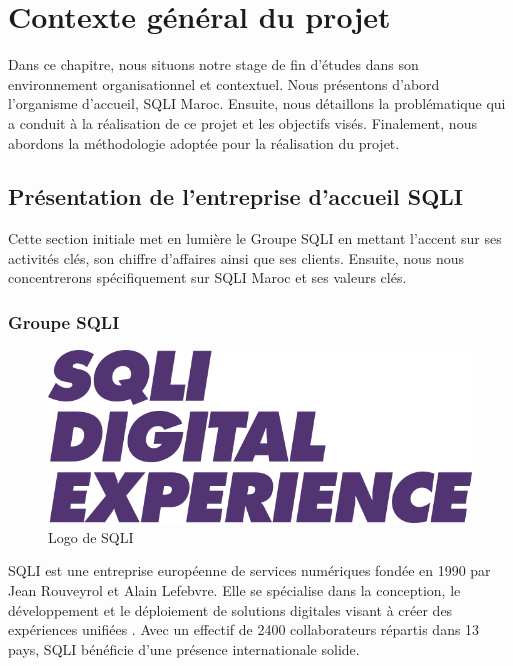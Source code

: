 \chapter{Contexte général du projet}
\label{chap:Contexte général du projet}



Dans ce chapitre, nous situons notre stage de fin d’études dans son environnement organisationnel et contextuel. Nous présentons d'abord l’organisme d’accueil, SQLI Maroc. Ensuite, nous détaillons la problématique qui a conduit à la réalisation de ce projet et les objectifs visés. Finalement, nous abordons la méthodologie adoptée pour la réalisation du projet.
\newpage


\section{Présentation de l’entreprise d’accueil SQLI}

Cette section initiale met en lumière le Groupe SQLI en mettant l’accent sur ses activités clés, son
chiffre d’affaires ainsi que ses clients. Ensuite, nous nous concentrerons spécifiquement sur SQLI Maroc et
ses valeurs clés.

\subsection{Groupe SQLI}

\begin{figure}[h]
    \centering
    \includegraphics[scale=0.7]{Logos/SQLI_LOGO.png} %
    \caption{Logo de SQLI \cite{SQLI}}
    \label{fig:LogoSQLI}
\end{figure}

SQLI est une entreprise européenne de services numériques fondée en 1990 par Jean Rouveyrol et Alain Lefebvre. Elle se spécialise dans la conception, le développement et le déploiement de solutions digitales
visant à créer des expériences unifiées \cite{SQLI}. Avec un effectif de 2400 collaborateurs répartis dans 13 pays,
SQLI bénéficie d’une présence internationale solide.

